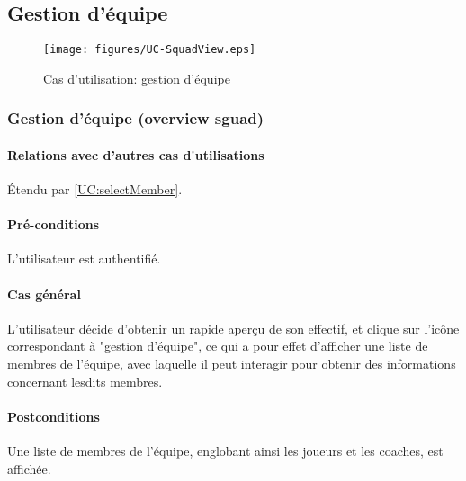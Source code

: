 

\subsection{Gestion d'équipe}

\begin{figure}[h]
  \centering
  \texttt{[image: figures/UC-SquadView.eps]}
  \caption{\label{fig:UC:SquadView} Cas d'utilisation: gestion d'équipe}
\end{figure}

\subsubsection{Gestion d'équipe (overview sguad)}
\label{UC:squadView}
\paragraph{Relations avec d'autres \gls{cas d'utilisation}s}
Étendu par \ref{UC:selectMember}.
\paragraph{Pré-conditions}
\begin{list}{}{\leftmargin=1.5em}
\item{L'\gls{utilisateur} est authentifié.}
\end{list}
\paragraph{Cas général}
L'utilisateur décide d'obtenir un rapide aperçu de son effectif, et clique sur l'icône correspondant à "gestion d'équipe", ce qui a pour effet d'afficher une liste de membres de l'équipe, avec laquelle il peut interagir pour obtenir des informations concernant lesdits membres.
\paragraph{Postconditions} Une liste de membres de l'équipe, englobant ainsi 
les joueurs et les coaches, est affichée.

